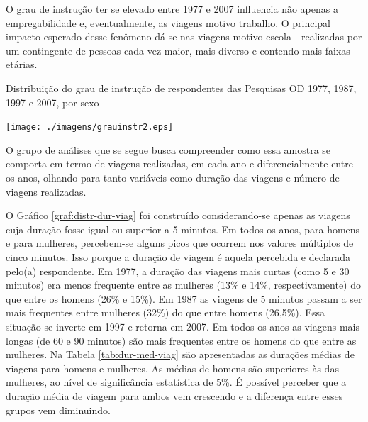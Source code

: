 O grau de instrução ter se elevado entre 1977 e 2007 influencia não apenas a empregabilidade e, eventualmente, as viagens motivo trabalho. O principal impacto esperado desse fenômeno dá-se nas viagens motivo escola - realizadas por um contingente de pessoas cada vez maior, mais diverso e contendo mais faixas etárias.

\begin{grafico}[htb]%
    \caption{\label{graf:distr-grau-instr} Distribuição do grau de instrução de respondentes das Pesquisas OD 1977, 1987, 1997 e 2007, por sexo}%
    \begin{center}%
        \texttt{[image: ./imagens/grauinstr2.eps]}%
    \end{center}%
\end{grafico}%

\clearpage
O grupo de análises que se segue busca compreender como essa amostra se comporta em termo de viagens realizadas, em cada ano e diferencialmente entre os anos, olhando para tanto variáveis como duração das viagens e número de viagens realizadas.


O Gráfico \ref{graf:distr-dur-viag} foi construído considerando-se apenas as viagens cuja duração fosse igual ou superior a 5 minutos. Em todos os anos, para homens e para mulheres, percebem-se alguns picos que ocorrem nos valores múltiplos de cinco minutos. Isso porque a duração de viagem é aquela percebida e declarada pelo(a) respondente. Em 1977, a duração das viagens mais curtas (como 5 e 30 minutos) era menos frequente entre as mulheres (13\% e 14\%, respectivamente) do que entre os homens (26\% e 15\%). Em 1987 as viagens de 5 minutos passam a ser mais frequentes entre mulheres (32\%) do que entre homens (26,5\%). Essa situação se inverte em 1997 e retorna em 2007.
Em todos os anos as viagens mais longas (de 60 e 90 minutos) são mais frequentes entre os homens do que entre as mulheres.
Na Tabela \ref{tab:dur-med-viag} são apresentadas as durações médias de viagens para homens e mulheres. As médias de homens são superiores às das mulheres, ao nível de significância estatística de 5\%. É possível perceber que a duração média de viagem para ambos vem crescendo e a diferença entre esses grupos vem diminuindo.

